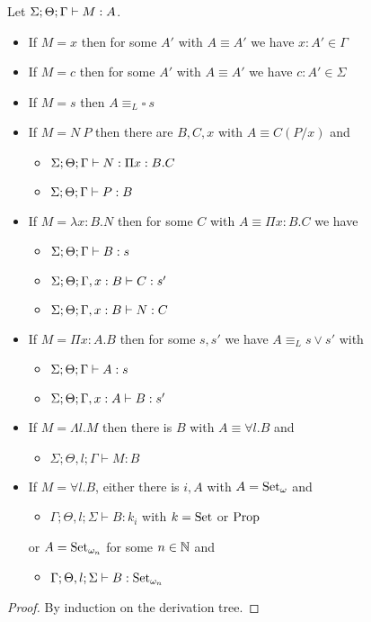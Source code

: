 \documentclass[]{StandardTemplate}
\begin{document}
\begin{prop}[Inversion]
  Let $ {\Sigma;\Theta;\Gamma} \vdash M : A $.
  \begin{itemize}
  \item If $ M = x $ then for some $ A' $ with $ A \equiv A' $ we have $ x : A' \in \Gamma $
  \item If $ M = c $ then for some $ A' $ with $ A \equiv A' $ we have $ c : A' \in \Sigma $
  \item If $ M = s $ then $ A \equiv_L \square~s $
  \item If $ M = N~P $ then there are $ B,C,x $ with $ A \equiv C(P/x) $ and \begin{itemize}
    \item $ {\Sigma;\Theta;\Gamma} \vdash N : \Pi x: B.C $
    \item $ {\Sigma;\Theta;\Gamma} \vdash P : B$
    \end{itemize}
  \item If $ M = \lambda x : B. N $ then for some $ C$ with  $ A \equiv \Pi x : B . C  $ we have \begin{itemize}
    \item $ {\Sigma;\Theta;\Gamma} \vdash B : s $
    \item  $ {\Sigma;\Theta;\Gamma}, x : B \vdash C : s' $
    \item  $ {\Sigma;\Theta;\Gamma}, x : B \vdash  N : C$
    \end{itemize}
  \item If $ M = \Pi x : A . B $ then for some $ s,s' $ we have $ A \equiv_L s \lor s' $ with \begin{itemize}
    \item $ {\Sigma;\Theta;\Gamma} \vdash A : s $
    \item $ {\Sigma;\Theta;\Gamma}, x : A \vdash B : s' $
    \end{itemize}
  \item If $ M = \Lambda l. M $ then there is $B $ with $ A \equiv \forall l. B $ and \begin{itemize}
    \item $ \Sigma;\Theta,l;\Gamma \vdash M : B $
    \end{itemize}
  \item If $ M = \forall l. B $, either there is $ i , A$ with  $A = \text{Set}_\omega $ and  \begin{itemize}
    \item $ \Gamma;\Theta,l;\Sigma \vdash B : k_i $ with $ k = \text{Set} $ or $ \text{Prop} $
    \end{itemize} or $ A = \text{Set}_{\omega_n} $ for some $ n \in \mathbb{N} $ and \begin{itemize}
    \item $ \Gamma;\Theta,l;\Sigma \vdash B : \text{Set}_{\omega_n} $
    \end{itemize}
  \end{itemize}
\end{prop}
\begin{proof}
By induction on the derivation tree.
\end{proof}
\end{document}
